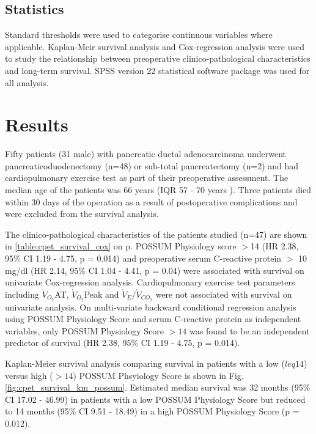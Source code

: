 \subsection{Statistics}
Standard thresholds were used to categorise continuous variables where applicable. Kaplan-Meir survival analysis and Cox-regression analysis were used to study the relationship between preoperative clinico-pathological characteristics and long-term survival. SPSS version 22 statistical software package was used for all analysis.

\section{Results}




Fifty patients (31 male) with pancreatic ductal adenocarcinoma underwent pancreaticoduodenectomy (n=48) or sub-total pancreatectomy (n=2) and had cardiopulmonary exercise test as part of their preoperative assessment. The median age of the patients was 66 years (IQR 57 - 70 years ). Three patients died within 30 days of the operation as a result of postoperative complications and were excluded from the survival analysis.

The clinico-pathological characteristics of the patients studied (n=47) are shown in \ref{table:cpet_survival_cox} on p\pageref{table:cpet_survival_cox}. POSSUM Physiology score $>$14 (HR 2.38, 95\% CI 1.19 - 4.75, p = 0.014) and preoperative serum C-reactive protein $>$ 10 mg/dl (HR 2.14, 95\% CI 1.04 - 4.41, p = 0.04) were associated with survival on univariate Cox-regression analysis. Cardiopulmonary exercise test parameters including $\dot{V}_{O_2}$AT, $\dot{V}_{O_2}$Peak and $\dot{V}_E/\dot{V}_{CO_2}$ were not associated with survival on univariate analysis.
On multi-variate backward conditional regression analysis using POSSUM Physiology Score and serum C-reactive protein as independent variables, only POSSUM Physiology Score $>14$  was found to be an independent predictor of survival (HR 2.38, 95\% CI 1.19 - 4.75, p = 0.014).

Kaplan-Meier survival analysis comparing survival in patients with a low ($leq14$) versus high ($>14$) POSSUM Phsyiology Score is shown in Fig. \ref{fig:cpet_survival_km_possum}. Estimated median survival was  32 months (95\% CI 17.02 - 46.99) in patients with a low POSSUM Physiology Score but reduced to 14 months (95\% CI 9.51 - 18.49) in a high POSSUM Physiology Score (p = 0.012).

